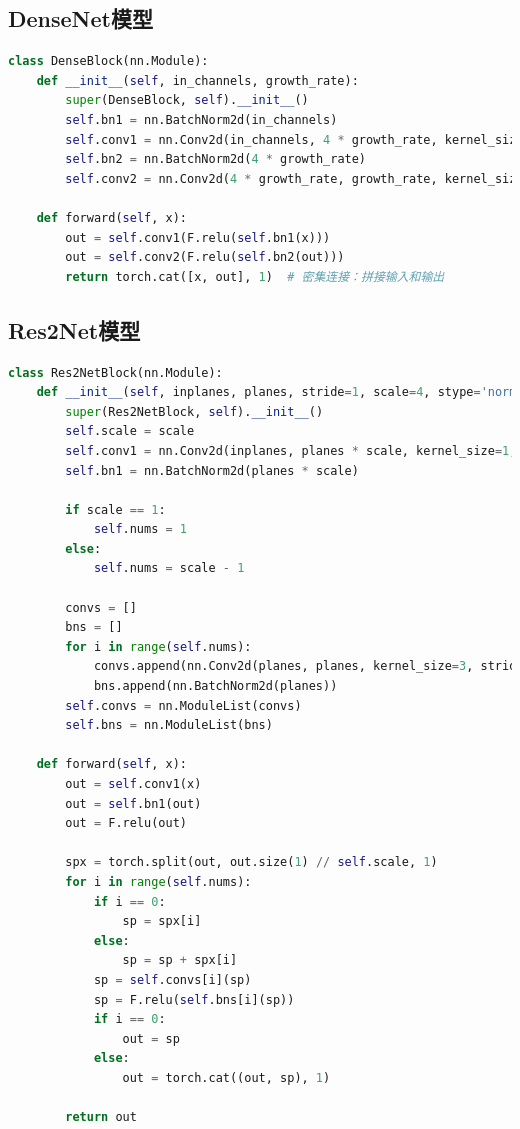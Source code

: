 \documentclass[12pt,a4paper]{article}
\begin{document}
\subsection{DenseNet模型}
\begin{lstlisting}[language=Python, caption=DenseNet基本块结构]
class DenseBlock(nn.Module):
    def __init__(self, in_channels, growth_rate):
        super(DenseBlock, self).__init__()
        self.bn1 = nn.BatchNorm2d(in_channels)
        self.conv1 = nn.Conv2d(in_channels, 4 * growth_rate, kernel_size=1, bias=False)
        self.bn2 = nn.BatchNorm2d(4 * growth_rate)
        self.conv2 = nn.Conv2d(4 * growth_rate, growth_rate, kernel_size=3, padding=1, bias=False)
        
    def forward(self, x):
        out = self.conv1(F.relu(self.bn1(x)))
        out = self.conv2(F.relu(self.bn2(out)))
        return torch.cat([x, out], 1)  # 密集连接：拼接输入和输出
\end{lstlisting}

\subsection{Res2Net模型}
\begin{lstlisting}[language=Python, caption=Res2Net基本块结构]
class Res2NetBlock(nn.Module):
    def __init__(self, inplanes, planes, stride=1, scale=4, stype='normal'):
        super(Res2NetBlock, self).__init__()
        self.scale = scale
        self.conv1 = nn.Conv2d(inplanes, planes * scale, kernel_size=1, bias=False)
        self.bn1 = nn.BatchNorm2d(planes * scale)
        
        if scale == 1:
            self.nums = 1
        else:
            self.nums = scale - 1
            
        convs = []
        bns = []
        for i in range(self.nums):
            convs.append(nn.Conv2d(planes, planes, kernel_size=3, stride=stride, padding=1, bias=False))
            bns.append(nn.BatchNorm2d(planes))
        self.convs = nn.ModuleList(convs)
        self.bns = nn.ModuleList(bns)
        
    def forward(self, x):
        out = self.conv1(x)
        out = self.bn1(out)
        out = F.relu(out)
        
        spx = torch.split(out, out.size(1) // self.scale, 1)
        for i in range(self.nums):
            if i == 0:
                sp = spx[i]
            else:
                sp = sp + spx[i]
            sp = self.convs[i](sp)
            sp = F.relu(self.bns[i](sp))
            if i == 0:
                out = sp
            else:
                out = torch.cat((out, sp), 1)
        
        return out
\end{lstlisting}
\end{document}
